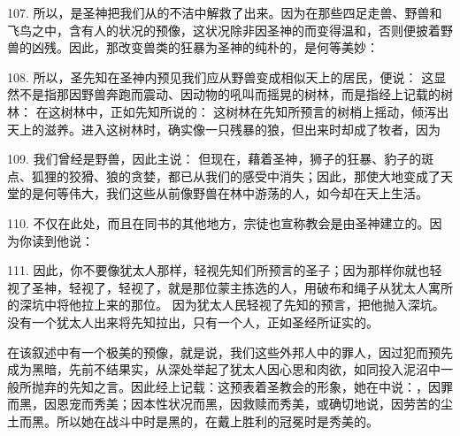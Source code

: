 107. 所以，是圣神把我们从的不洁中解救了出来。因为在那些四足走兽、野兽和飞鸟之中，含有人的状况的预像，这状况除非因圣神的而变得温和，否则便披着野兽的凶残。因此，那改变兽类的狂暴为圣神的纯朴的，是何等美妙： \par

108. 所以，圣先知在圣神内预见我们应从野兽变成相似天上的居民，便说： 这显然不是指那因野兽奔跑而震动、因动物的吼叫而摇晃的树林，而是指经上记载的树林： 在这树林中，正如先知所说的： 这树林在先知所预言的树梢上摇动，倾泻出天上的滋养。进入这树林时，确实像一只残暴的狼，但出来时却成了牧者，因为\par

109. 我们曾经是野兽，因此主说：  但现在，藉着圣神，狮子的狂暴、豹子的斑点、狐狸的狡猾、狼的贪婪，都已从我们的感受中消失；因此，那使大地变成了天堂的是何等伟大，我们这些从前像野兽在林中游荡的人，如今却在天上生活。 \par

110. 不仅在此处，而且在同书的其他地方，宗徒也宣称教会是由圣神建立的。因为你读到他说： \par

111. 因此，你不要像犹太人那样，轻视先知们所预言的圣子；因为那样你就也轻视了圣神，轻视了，轻视了，就是那位蒙主拣选的人，用破布和绳子从犹太人寓所的深坑中将他拉上来的那位。  因为犹太人民轻视了先知的预言，把他抛入深坑。没有一个犹太人出来将先知拉出，只有一个人，正如圣经所证实的。\par

在该叙述中有一个极美的预像，就是说，我们这些外邦人中的罪人，因过犯而预先成为黑暗，先前不结果实，从深处举起了犹太人因心思和肉欲，如同投入泥沼中一般所抛弃的先知之言。因此经上记载：这预表着圣教会的形象，她在中说：，因罪而黑，因恩宠而秀美；因本性状况而黑，因救赎而秀美，或确切地说，因劳苦的尘土而黑。所以她在战斗中时是黑的，在戴上胜利的冠冕时是秀美的。\par

